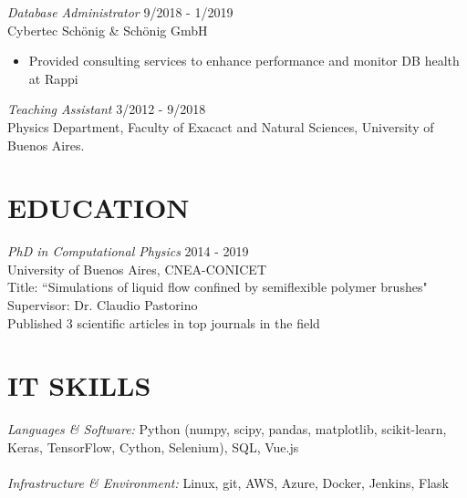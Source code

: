 \documentclass[margin]{res}
\begin{document}
\begin{resume}
	{\sl Database Administrator} \hfill 9/2018 - 1/2019 \\
		Cybertec Sch\"onig \& Sch\"onig GmbH 
		\begin{itemize}  \itemsep -2pt %
		 \item Provided consulting services to enhance performance and 
             monitor DB health at Rappi
                \end{itemize}
		{\sl Teaching Assistant} \hfill 3/2012 - 9/2018 \\
		Physics Department, Faculty of Exacact and Natural Sciences, 
		University of Buenos Aires.

\section{EDUCATION} {\sl PhD in Computational Physics}  \hfill 2014 - 2019 \\
                University of Buenos Aires, CNEA-CONICET \\ 
                Title: ``Simulations of liquid flow confined by semiflexible 
		polymer brushes"  \\
                Supervisor: Dr. Claudio Pastorino \\ 
                Published 3 scientific articles in top journals in the field \\ 

 
    \section{IT SKILLS} {\sl Languages \& Software:} Python (numpy, scipy, pandas, matplotlib, scikit-learn, Keras, TensorFlow, Cython, Selenium), SQL, Vue.js \\ \\ 
    {\sl Infrastructure \& Environment:} Linux, git, AWS, Azure, Docker, Jenkins, Flask \\
               

\end{resume}
\end{document}
